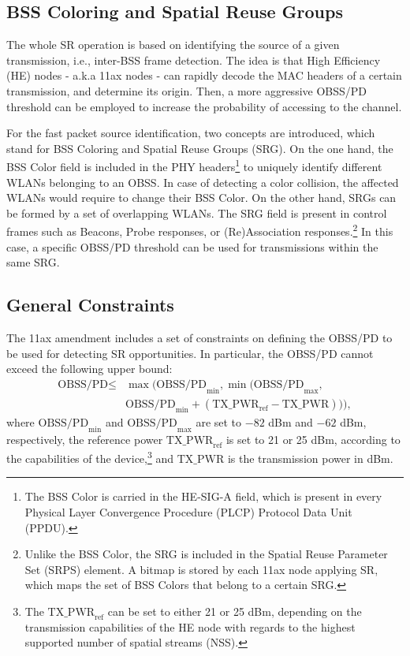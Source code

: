 \documentclass[conference]{IEEEtran}
\begin{document}
	\subsection{BSS Coloring and Spatial Reuse Groups}
	
	The whole SR operation is based on identifying the source of a given transmission, i.e., inter-BSS frame detection. The idea is that High Efficiency (HE) nodes - a.k.a 11ax nodes - can rapidly decode the MAC headers of a certain transmission, and determine its origin. Then, a more aggressive OBSS/PD threshold can be employed to increase the probability of accessing to the channel.
	
	For the fast packet source identification, two concepts are introduced, which stand for BSS Coloring and Spatial Reuse Groups (SRG). On the one hand, the BSS Color field is included in the PHY headers\footnote{The BSS Color is carried in the HE-SIG-A field, which is present in every Physical Layer Convergence Procedure (PLCP) Protocol Data Unit (PPDU).} to uniquely identify different WLANs belonging to an OBSS. In case of detecting a color collision, the affected WLANs would require to change their BSS Color. On the other hand, SRGs can be formed by a set of overlapping WLANs. The SRG field is present in control frames such as Beacons, Probe responses, or (Re)Association responses.\footnote{Unlike the BSS Color, the SRG is included in the Spatial Reuse Parameter Set (SRPS) element. A bitmap is stored by each 11ax node applying SR, which maps the set of BSS Colors that belong to a certain SRG.} In this case, a specific OBSS/PD threshold can be used for transmissions within the same SRG.
	
	\subsection{General Constraints}
	The 11ax amendment includes a set of constraints on defining the OBSS/PD to be used for detecting SR opportunities. In particular, the OBSS/PD cannot exceed the following upper bound:
	\begin{align}\nonumber \text{OBSS/PD} \leq & \max\Big(\text{OBSS/PD}_{\min}, \min\big(\text{OBSS/PD}_{\max},\\ & \text{OBSS/PD}_{\min} + (\text{TX\_PWR}_{\text{ref}}-\text{TX\_PWR})\big)\Big), \nonumber \end{align}
	where $\text{OBSS/PD}_{\min}$ and $\text{OBSS/PD}_{\max}$ are set to $-82$ dBm and $-62$ dBm, respectively, the reference power $\text{TX\_PWR}_{\text{ref}}$ is set to 21 or 25 dBm, according to the
	capabilities of the device,\footnote{The $\text{TX\_PWR}_{\text{ref}}$ can be set to either 21 or 25 dBm, depending on the transmission capabilities of the HE node with regards to the highest supported number of spatial streams (NSS).} and $\text{TX\_PWR}$ is the transmission power in dBm.
	
\end{document}
